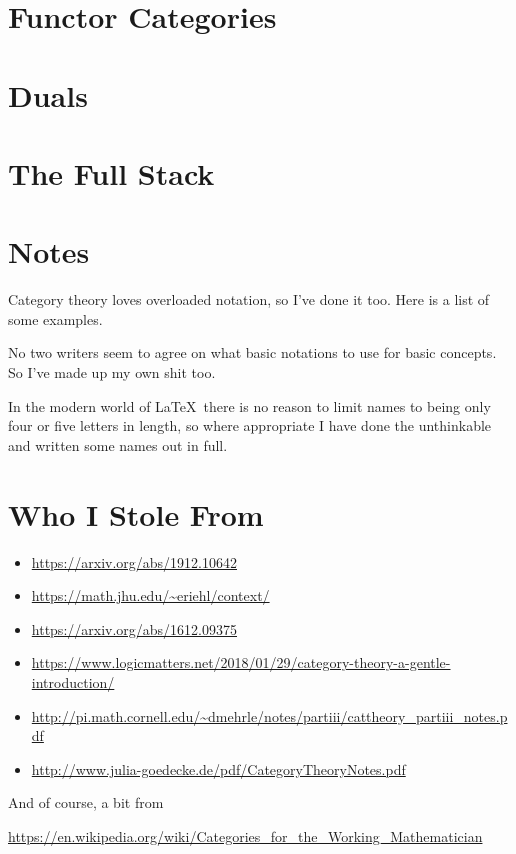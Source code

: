 \documentclass[12pt]{article}
\begin{document}
\section{Functor Categories}

\section{Duals}

\section{The Full Stack}

\section{Notes}

Category theory loves overloaded notation, so I've done it too. Here is a list of some examples.

No two writers seem to agree on what basic notations to use for basic concepts. So I've made up my own shit too.

In the modern world of \LaTeX\ there is no reason to limit names to being only four or five letters in length, so where appropriate I have done the unthinkable and written some names out in full.

\section{Who I Stole From}

\small
\begin{itemize}
\item \url{https://arxiv.org/abs/1912.10642}

\item \url{https://math.jhu.edu/~eriehl/context/}

\item \url{https://arxiv.org/abs/1612.09375}

\item \url{https://www.logicmatters.net/2018/01/29/category-theory-a-gentle-introduction/}

\item \url{http://pi.math.cornell.edu/~dmehrle/notes/partiii/cattheory_partiii_notes.pdf}

\item \url{http://www.julia-goedecke.de/pdf/CategoryTheoryNotes.pdf}

\end{itemize}

And of course, a bit from

\url{https://en.wikipedia.org/wiki/Categories_for_the_Working_Mathematician}
\end{document}
